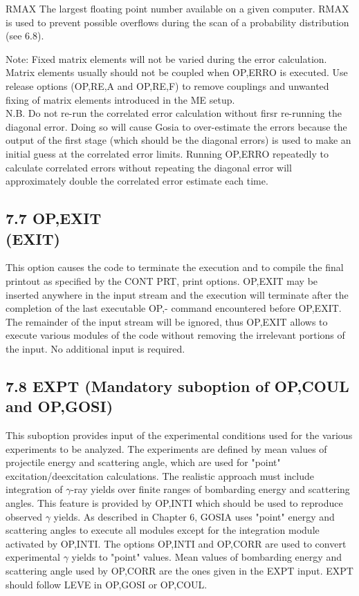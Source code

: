\documentclass[10pt]{article}
\begin{document}
RMAX The largest floating point number available on a given computer. RMAX is used to prevent possible overflows during the scan of a probability distribution (see 6.8).

Note: Fixed matrix elements will not be varied during the error calculation. Matrix elements usually should not be coupled when OP,ERRO is executed. Use release options (OP,RE,A and OP,RE,F) to remove couplings and unwanted fixing of matrix elements introduced in the ME setup.\\
N.B. Do not re-run the correlated error calculation without firsr re-running the diagonal error. Doing so will cause Gosia to over-estimate the errors because the output of the first stage (which should be the diagonal errors) is used to make an initial guess at the correlated error limits. Running OP,ERRO repeatedly to calculate correlated errors without repeating the diagonal error will approximately double the correlated error estimate each time.

\subsection*{7.7 OP,EXIT \\
 (EXIT)}
This option causes the code to terminate the execution and to compile the final printout as specified by the CONT PRT, print options. OP,EXIT may be inserted anywhere in the input stream and the execution will terminate after the completion of the last executable OP,- command encountered before OP,EXIT. The remainder of the input stream will be ignored, thus OP,EXIT allows to execute various modules of the code without removing the irrelevant portions of the input. No additional input is required.

\subsection*{7.8 EXPT (Mandatory suboption of OP,COUL and OP,GOSI)}
This suboption provides input of the experimental conditions used for the various experiments to be analyzed. The experiments are defined by mean values of projectile energy and scattering angle, which are used for "point" excitation/deexcitation calculations. The realistic approach must include integration of $\gamma$-ray yields over finite ranges of bombarding energy and scattering angles. This feature is provided by OP,INTI which should be used to reproduce observed $\gamma$ yields. As described in Chapter 6, GOSIA uses "point" energy and scattering angles to execute all modules except for the integration module activated by OP,INTI. The options OP,INTI and OP,CORR are used to convert experimental $\gamma$ yields to "point" values. Mean values of bombarding energy and scattering angle used by OP,CORR are the ones given in the EXPT input. EXPT should follow LEVE in OP,GOSI or OP,COUL.
\end{document}
